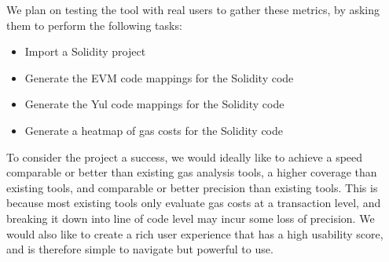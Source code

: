 We plan on testing the tool with real users to gather these metrics, by asking them to perform the
following tasks:
\begin{itemize}
  \item Import a Solidity project
  \item Generate the EVM code mappings for the Solidity code
  \item Generate the Yul code mappings for the Solidity code
  \item Generate a heatmap of gas costs for the Solidity code
\end{itemize}

To consider the project a success, we would ideally like to achieve a speed comparable or better
than existing gas analysis tools, a higher coverage than existing tools, and comparable or better
precision than existing tools. This is because most existing tools only evaluate gas costs at a
transaction level, and breaking it down into line of code level may incur some loss of precision.
We would also like to create a rich user experience that has a high usability score, and is therefore
simple to navigate but powerful to use.